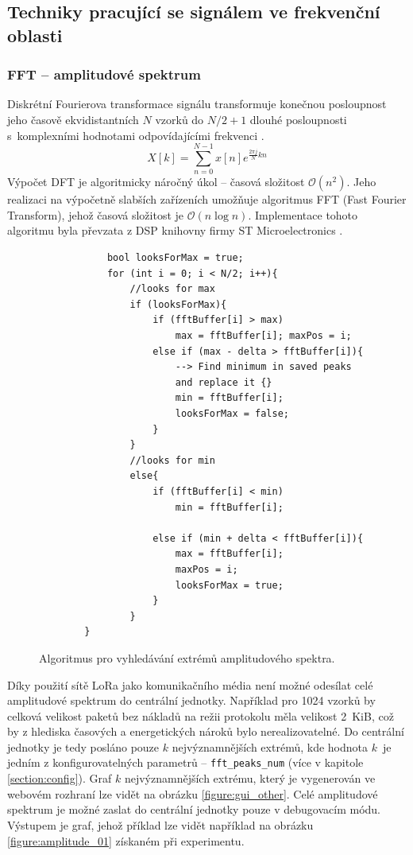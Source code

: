         
    \subsection{Techniky pracující se signálem ve frekvenční oblasti}
    \subsubsection{FFT – amplitudové spektrum}
        Diskrétní Fourierova transformace signálu transformuje konečnou posloupnost jeho časově ekvidistantních $N$ vzorků do $N/2 +1$ dlouhé posloupnosti s~komplexními hodnotami odpovídajícími frekvenci \cite{book:2}.
        \begin{equation}
            X[k] = \sum_{n=0}^{N-1} x[n] e^{\frac{2\pi j}{N} k n}
        \end{equation}{}
    Výpočet DFT je algoritmicky náročný úkol – časová složitost $\mathcal{O}(n^2)$. Jeho realizaci na výpočetně slabších zařízeních umožňuje algoritmus FFT (Fast Fourier Transform), jehož časová složitost je $\mathcal{O}(n \log{}n)$. Implementace tohoto algoritmu byla převzata z DSP knihovny firmy ST Microelectronics \cite{software:1}.\\
    
    \begin{figure}[!hbp]
        \centering
         \begin{lstlisting}
            bool looksForMax = true;
    	    for (int i = 0; i < N/2; i++){
    	        //looks for max
        		if (looksForMax){   	
        			if (fftBuffer[i] > max)
        				max = fftBuffer[i]; maxPos = i;
        			else if (max - delta > fftBuffer[i]){
        			    --> Find minimum in saved peaks 
        			    and replace it {}
        				min = fftBuffer[i];
        				looksForMax = false;
        			}
        		}
        		//looks for min
        		else{                   
        			if (fftBuffer[i] < min)
        				min = fftBuffer[i];
        
        			else if (min + delta < fftBuffer[i]){
        				max = fftBuffer[i];
        				maxPos = i;
        				looksForMax = true;
        			}
        		}
    	}\end{lstlisting}
        \caption{Algoritmus pro vyhledávání extrémů amplitudového spektra.}
        \label{figure:algorithm}
    \end{figure}
    
    Díky použití sítě LoRa jako komunikačního média není možné odesílat celé amplitudové spektrum do centrální jednotky. Například pro 1024 vzorků by celková velikost paketů bez nákladů na režii protokolu měla velikost 2~KiB, což by z hlediska časových a energetických nároků bylo nerealizovatelné. Do centrální jednotky je tedy posláno pouze $k$ nejvýznamnějších extrémů, kde hodnota $k$~je jedním z konfigurovatelných parametrů – \texttt{fft\_peaks\_num} (více v kapitole \ref{section:config}).
    Graf $k$ nejvýznamnějších extrému, který je vygenerován ve webovém rozhraní lze vidět na obrázku \ref{figure:gui_other}. Celé amplitudové spektrum je možné zaslat do centrální jednotky pouze v debugovacím módu. Výstupem je graf, jehož příklad lze vidět například na obrázku \ref{figure:amplitude_01} získaném při experimentu.

